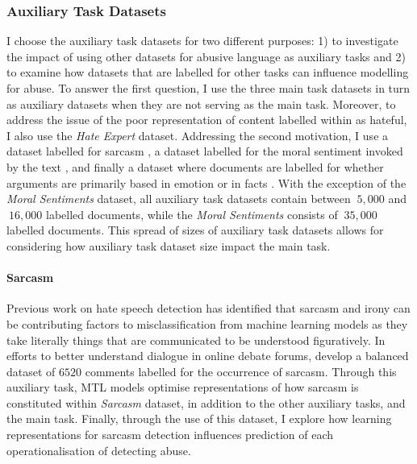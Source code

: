 \subsubsection{Auxiliary Task Datasets}
I choose the auxiliary task datasets for two different purposes: 1) to investigate the impact of using other datasets for abusive language as auxiliary tasks and 2) to examine how datasets that are labelled for other tasks can influence modelling for abuse.
To answer the first question, I use the three main task datasets in turn as auxiliary datasets when they are not serving as the main task. Moreover, to address the issue of the poor representation of content labelled within as hateful, I also use the \textit{Hate Expert} dataset.
Addressing the second motivation, I use a dataset labelled for sarcasm \citep{Oraby_sarcasm:2016}, a dataset labelled for the moral sentiment invoked by the text \citep{Hoover:2019}, and finally a dataset where documents are labelled for whether arguments are primarily based in emotion or in facts \citep{Oraby_factfeel:2015}.
With the exception of the \textit{Moral Sentiments} dataset, all auxiliary task datasets contain between $~5,000$ and $~16,000$ labelled documents, while the \textit{Moral Sentiments} consists of $~35,000$ labelled documents.
This spread of sizes of auxiliary task datasets allows for considering how auxiliary task dataset size impact the main task.

\paragraph{Sarcasm}
Previous work on hate speech detection \citep{Rottger:2021} has identified that sarcasm and irony can be contributing factors to misclassification from machine learning models as they take literally things that are communicated to be understood figuratively.
In efforts to better understand dialogue in online debate forums, \citet{Oraby_sarcasm:2016} develop a balanced dataset of $6520$ comments labelled for the occurrence of sarcasm.
Through this auxiliary task, MTL models optimise representations of how sarcasm is constituted within \textit{Sarcasm} dataset, in addition to the other auxiliary tasks, and the main task.
Finally, through the use of this dataset, I explore how learning representations for sarcasm detection influences prediction of each operationalisation of detecting abuse.

